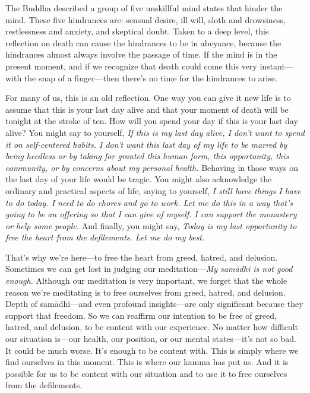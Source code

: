 The Buddha described a group of five unskillful mind states that hinder 
the mind. These five hindrances are: sensual desire, ill will, sloth 
and drowsiness, restlessness and anxiety, and skeptical doubt. Taken to 
a deep level, this reflection on death can cause the hindrances to be 
in abeyance, because the hindrances almost always involve the passage 
of time. If the mind is in the present moment, and if we recognize that 
death could come this very instant---with the snap of a finger---then 
there's no time for the hindrances to arise.

For many of us, this is an old reflection. One way you can give it new 
life is to assume that this is your last day alive and that your moment 
of death will be tonight at the stroke of ten. How will you spend your 
day if this is your last day alive? You might say to yourself, \emph{If 
this is my last day alive, I don't want to spend it on self-centered 
habits. I don't want this last day of my life to be marred by being 
heedless or by taking for granted this human form, this opportunity, 
this community, or by concerns about my personal health.} Behaving in 
those ways on the last day of your life would be tragic. You might also 
acknowledge the ordinary and practical aspects of life, saying to 
yourself, \emph{I still have things I have to do today. I need to do 
chores and go to work. Let me do this in a way that's going to be an 
offering so that I can give of myself. I can support the monastery or 
help some people.} And finally, you might say, \emph{Today is my last 
opportunity to free the heart from the defilements. Let me do my best.}

That's why we're here---to free the heart from greed, hatred, and 
delusion. Sometimes we can get lost in judging our 
meditation---\emph{My samādhi is not good enough.} Although our 
meditation is very important, we forget that the whole reason we're 
meditating is to free ourselves from greed, hatred, and delusion. Depth 
of samādhi---and even profound insights---are only significant because 
they support that freedom. So we can reaffirm our intention to be free 
of greed, hatred, and delusion, to be content with our experience. No 
matter how difficult our situation is---our health, our position, or 
our mental states---it's not so bad. It could be much worse. It's 
enough to be content with. This is simply where we find ourselves in 
this moment. This is where our kamma has put us. And it is possible for 
us to be content with our situation and to use it to free ourselves 
from the defilements.

